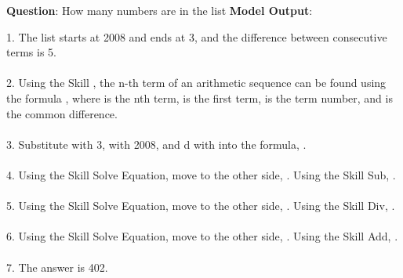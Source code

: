 \documentclass{article} \usepackage{arxiv}
\begin{document}
\begin{tcolorbox}[title = {MATH}, colback = Apricot!25!white, colframe = BrickRed!75!black] 
\textbf{Question}: How many numbers are in the list 
\tcblower
\textbf{Model Output}:


\quad


1. The list starts at 2008 and ends at 3, and the difference between consecutive terms is 5. \\ \\
2. Using the Skill , the n-th term of an arithmetic sequence can be found using the formula , where  is the nth term,  is the first term,  is the term number, and  is the common difference. \\ \\
3. Substitute  with 3,  with 2008, and d with  into the formula, . \\ \\
4. Using the Skill Solve Equation, move  to the other side, . Using the Skill Sub, . \\ \\
5. Using the Skill Solve Equation, move  to the other side, .  Using the Skill Div, . \\ \\
6. Using the Skill Solve Equation, move  to the other side, .  Using the Skill Add, . \\ \\
7. The answer is 402. \\
\end{tcolorbox}
\noindent\begin{minipage}{\textwidth}
 \label{Tab:example_compose_math_skill_2}
\end{minipage}


\newpage
\end{document}
